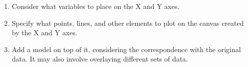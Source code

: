 \begin{enumerate}
    \item Consider what variables to place on the X and Y axes.
    \item Specify what points, lines, and other elements to plot on the canvas created by the X and Y axes.
    \item Add a model on top of it, considering the correspondence with the original data. It may also involve overlaying different sets of data.
\end{enumerate}
